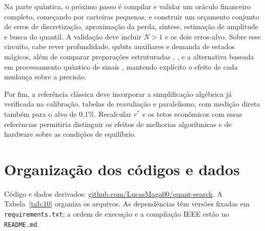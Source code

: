 \documentclass[conference,a4paper]{IEEEtran}
\begin{document}
Na parte quântica, o próximo passo é compilar e validar um oráculo financeiro completo, começando por carteiras pequenas, e construir um orçamento conjunto de erros de discretização, aproximação da perda, síntese, estimação de amplitude e busca do quantil. A validação deve incluir \(N>1\) e os dois erros-alvo. Sobre esse circuito, cabe rever profundidade, qubits auxiliares e demanda de estados mágicos, além de comparar preparações estruturadas \cite{carreravazquez2021stateprep}, \cite{iaconis2024normal}, \cite{xie2025gaussian} e a alternativa baseada em processamento quântico de sinais \cite{stamatopoulos2024risk}, mantendo explícito o efeito de cada mudança sobre a precisão.

Por fim, a referência clássica deve incorporar a simplificação algébrica já verificada na calibração, tabelas de reavaliação e paralelismo, com medição direta também para o alvo de 0,1\%. Recalcular \(r^*\) e os tetos econômicos com essas referências permitiria distinguir os efeitos de melhorias algorítmicas e de hardware sobre as condições de equilíbrio.

\section{Organização dos códigos e dados}\label{organizauxe7uxe3o-dos-cuxf3digos-e-dados}

Código e dados derivados: \href{https://github.com/LucasMaga00/quant-search}{github.com/LucasMaga00/quant-search}. A Tabela~\ref{tab:10} organiza os arquivos. As dependências têm versões fixadas em \texttt{requirements.txt}; a ordem de execução e a compilação IEEE estão no \texttt{README.md}.
\end{document}
